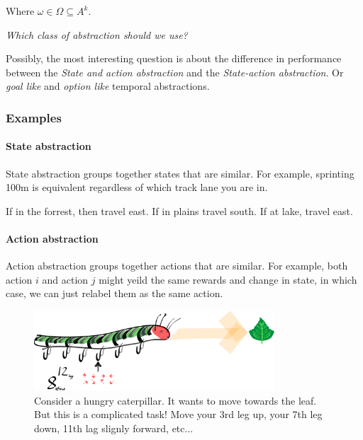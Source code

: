 
Where $\omega \in \Omega \subseteq A^k$.


\begin{displayquote}
\textit{Which class of abstraction should we use?}
\end{displayquote}

Possibly, the most interesting question is about the difference in performance between
the \textit{State and action abstraction} and the \textit{State-action abstraction}.
Or \textit{goal like} and \textit{option like} temporal abstractions.

\subsubsection{Examples}

\paragraph{State abstraction}

State abstraction groups together states that are similar. For example,
sprinting 100m is equivalent regardless of which track lane you are in.

If in the forrest, then travel east. If in plains travel south. If at lake, travel east.


\paragraph{Action abstraction}

Action abstraction groups together actions that are similar. For
example, both action $i$ and action $j$ might yeild the same rewards and change in state,
in which case, we can just relabel them as the same action.

\begin{figure}[h!]
\centering
\includegraphics[width=0.8\textwidth,height=0.2\textheight]{../../pictures/drawings/hungry-caterpillar.png}
\caption{Consider a hungry caterpillar. It wants to move towards the leaf. But this is a complicated task! Move your 3rd leg up, your 7th leg down, 11th lag slignly forward, etc...}
\end{figure}


